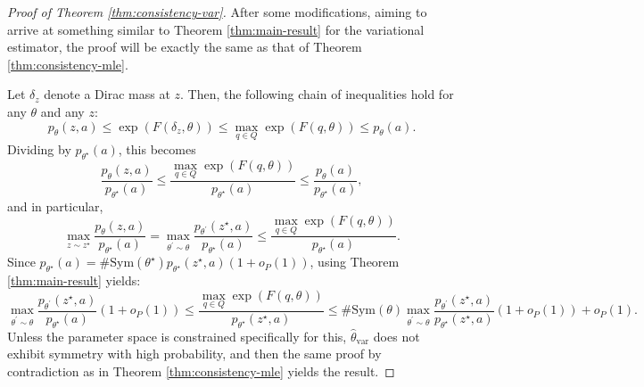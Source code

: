 \documentclass[../../main.tex]{subfiles} %
\begin{document}
\begin{proof}[Proof of Theorem \ref{thm:consistency-var}]
	After some modifications, aiming to arrive at something similar to Theorem 
	\ref{thm:main-result} for the variational estimator, the proof will be exactly 
	the same as that of 
	Theorem \ref{thm:consistency-mle}. 
	
	Let \(\delta_z\) denote a Dirac mass at 
	\(z\). Then, the following chain of inequalities hold for any \(\theta\) and any 
	\(z\):
	\begin{equation*}
		p_{\theta}(z, a) \leq \exp(F(\delta_z, \theta)) \leq \max_{q \in Q} \exp(F(q, 
		\theta)) \leq p_{\theta}(a).
	\end{equation*}
	Dividing by \(p_{\theta^\star}(a)\), this becomes
	\begin{equation*}
		\frac{p_{\theta}(z, a)}{p_{\theta^\star}(a)} \leq \frac{\max_{q \in Q} 
			\exp(F(q, 
			\theta))}{p_{\theta^\star}(a)} \leq \frac{p_{\theta}(a)}{p_{\theta^\star}(a)},
	\end{equation*}
	and in particular,
	\begin{equation}
		\max_{z \sim z^\star} \frac{p_{\theta}(z, a)}{p_{\theta^\star}(a)} = 
		\max_{\theta^\prime \sim \theta} \frac{p_{\theta^\prime}(z^\star, 
			a)}{p_{\theta^\star}(a)} \leq \frac{\max_{q \in Q} \exp(F(q, 
			\theta))}{p_{\theta^\star}(a)}.
	\end{equation}
	Since \(p_{\theta^\star}(a) = \text{\#Sym}(\theta^\star) 
	p_{\theta^\star}(z^\star, a)(1 + o_P(1))\), using Theorem 
	\ref{thm:main-result} yields:
	\begin{equation}
		\max_{\theta^\prime \sim \theta} \frac{p_{\theta^\prime}(z^\star, 
			a)}{p_{\theta^\star}(a)}(1 + o_P(1)) \leq \frac{\max_{q \in Q} \exp(F(q, 
			\theta))}{p_{\theta^\star}(z^\star, a)} \leq \text{\#Sym}(\theta) 
		\max_{\theta^\prime \sim \theta} \frac{p_{\theta^\prime}(z^\star, 
			a)}{p_{\theta^\star}(z^\star, a)}(1 + o_P(1)) + o_P(1).
	\end{equation}
	Unless the parameter space is constrained specifically for this, \(\hat 
	\theta_{\text{var}}\) does not exhibit symmetry with high probability, and 
	then the same proof by contradiction as in Theorem 
	\ref{thm:consistency-mle} yields the result.
\end{proof}
\end{document}
